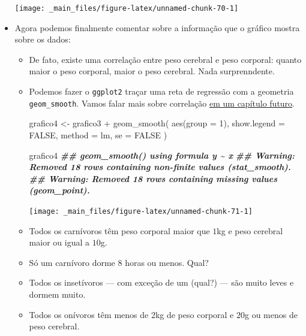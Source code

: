 \documentclass[
  11pt]{report}
\newenvironment{Shaded}{\begin{snugshade}}{\end{snugshade}}
\newcommand{\AttributeTok}[1]{\textcolor[rgb]{0.77,0.63,0.00}{#1}}
\newcommand{\ConstantTok}[1]{\textcolor[rgb]{0.00,0.00,0.00}{#1}}
\newcommand{\DecValTok}[1]{\textcolor[rgb]{0.00,0.00,0.81}{#1}}
\newcommand{\DocumentationTok}[1]{\textcolor[rgb]{0.56,0.35,0.01}{\textbf{\textit{#1}}}}
\newcommand{\FunctionTok}[1]{\textcolor[rgb]{0.00,0.00,0.00}{#1}}
\newcommand{\NormalTok}[1]{#1}
\newcommand{\OtherTok}[1]{\textcolor[rgb]{0.56,0.35,0.01}{#1}}
\newcommand{\SpecialCharTok}[1]{\textcolor[rgb]{0.00,0.00,0.00}{#1}}
\newcommand{\StringTok}[1]{\textcolor[rgb]{0.31,0.60,0.02}{#1}}
\renewenvironment{Shaded}{
    \begin{mdframed}[%
      roundcorner=2pt,%
      innerleftmargin=5pt,%
      innerrightmargin=5pt,%
      topline=true,%
      leftline=true,%
      rightline=true,%
      bottomline=true,%
      linewidth=0.5pt,%
      linecolor=black!20,%
      backgroundcolor=black!2,%
      skipabove=2ex,%
      skipbelow=2.5ex%
    ]%
  }
  {
    \end{mdframed}
  }
\begin{document}
\begin{itemize}
  \begin{center}\texttt{[image: \_main\_files/figure-latex/unnamed-chunk-70-1]} \end{center}
\item
  Agora podemos finalmente comentar sobre a informação que o gráfico mostra sobre os dados:

  \begin{itemize}
  \item
    De fato, existe uma correlação entre peso cerebral e peso corporal: quanto maior o peso corporal, maior o peso cerebral. Nada surprenndente.
  \item
    \protect\hypertarget{grafico4}{}{} Podemos fazer o \texttt{ggplot2} traçar uma reta de regressão com a geometria \texttt{geom\_smooth}. Vamos falar mais sobre correlação \protect\hyperlink{correlacao}{em um capítulo futuro}.

\begin{Shaded}
\begin{Highlighting}[]
\NormalTok{grafico4 }\OtherTok{\textless{}{-}}\NormalTok{ grafico3 }\SpecialCharTok{+}
  \FunctionTok{geom\_smooth}\NormalTok{(}
    \FunctionTok{aes}\NormalTok{(}\AttributeTok{group =} \DecValTok{1}\NormalTok{), }
    \AttributeTok{show.legend =} \ConstantTok{FALSE}\NormalTok{,}
    \AttributeTok{method =} \StringTok{\textquotesingle{}lm\textquotesingle{}}\NormalTok{, }
    \AttributeTok{se =} \ConstantTok{FALSE}
\NormalTok{  )}

\NormalTok{grafico4}
\DocumentationTok{\#\# \textasciigrave{}geom\_smooth()\textasciigrave{} using formula \textquotesingle{}y \textasciitilde{} x\textquotesingle{}}
\DocumentationTok{\#\# Warning: Removed 18 rows containing non{-}finite values (stat\_smooth).}
\DocumentationTok{\#\# Warning: Removed 18 rows containing missing values (geom\_point).}
\end{Highlighting}
\end{Shaded}

    \begin{center}\texttt{[image: \_main\_files/figure-latex/unnamed-chunk-71-1]} \end{center}
  \item
    Todos os carnívoros têm peso corporal maior que $1$kg e peso cerebral maior ou igual a $10$g.
  \item
    Só um carnívoro dorme $8$ horas ou menos. Qual?
  \item
    Todos os insetívoros --- com exceção de um (qual?) --- são muito leves e dormem muito.
  \item
    Todos os onívoros têm menos de $2$kg de peso corporal e $20$g ou menos de peso cerebral.
  \end{itemize}
\end{itemize}
\end{document}
